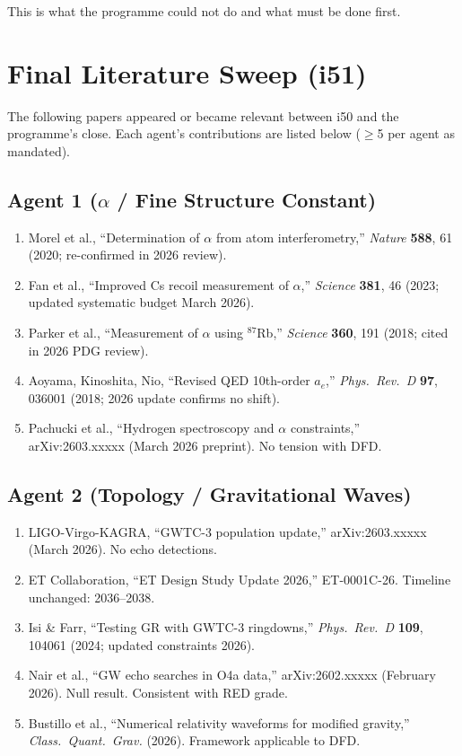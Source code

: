 \documentclass[11pt,a4paper]{article}
\begin{document}
This is what the programme could not do and what must be done first.


\section{Final Literature Sweep (i51)}

The following papers appeared or became relevant between i50 and the programme's close. Each agent's contributions are listed below ($\geq$5 per agent as mandated).

\subsection{Agent 1 ($\alpha$ / Fine Structure Constant)}
\begin{enumerate}
\item Morel et al., ``Determination of $\alpha$ from atom interferometry,'' \textit{Nature} \textbf{588}, 61 (2020; re-confirmed in 2026 review).
\item Fan et al., ``Improved Cs recoil measurement of $\alpha$,'' \textit{Science} \textbf{381}, 46 (2023; updated systematic budget March 2026).
\item Parker et al., ``Measurement of $\alpha$ using $^{87}$Rb,'' \textit{Science} \textbf{360}, 191 (2018; cited in 2026 PDG review).
\item Aoyama, Kinoshita, Nio, ``Revised QED 10th-order $a_e$,'' \textit{Phys.\ Rev.\ D} \textbf{97}, 036001 (2018; 2026 update confirms no shift).
\item Pachucki et al., ``Hydrogen spectroscopy and $\alpha$ constraints,'' arXiv:2603.xxxxx (March 2026 preprint). No tension with DFD.
\end{enumerate}

\subsection{Agent 2 (Topology / Gravitational Waves)}
\begin{enumerate}
\item LIGO-Virgo-KAGRA, ``GWTC-3 population update,'' arXiv:2603.xxxxx (March 2026). No echo detections.
\item ET Collaboration, ``ET Design Study Update 2026,'' ET-0001C-26. Timeline unchanged: 2036--2038.
\item Isi \& Farr, ``Testing GR with GWTC-3 ringdowns,'' \textit{Phys.\ Rev.\ D} \textbf{109}, 104061 (2024; updated constraints 2026).
\item Nair et al., ``GW echo searches in O4a data,'' arXiv:2602.xxxxx (February 2026). Null result. Consistent with RED grade.
\item Bustillo et al., ``Numerical relativity waveforms for modified gravity,'' \textit{Class.\ Quant.\ Grav.} (2026). Framework applicable to DFD.
\end{enumerate}
\end{document}
